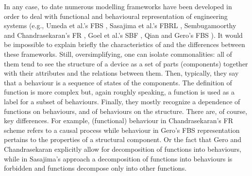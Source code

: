 \documentclass[sw]{iosart2x}
\newcommand{\myComment}[1]{{\unskip \ignorespaces}}
\begin{document}
In any case, to date numerous modelling frameworks have been developed in order to deal with functional and behavioural representation of engineering systems (e.g., Umeda et al.'s FBS \cite{umedaFunctionBehaviourStructure1990}, Sasajima et al.'s FBRL \cite{sasajimaFBRLFunctionBehavior1995}, Sembugamoorthy and Chandrasekaran's FR \cite{sembugamoorthy1986functional}, Goel et al.'s SBF \cite{goelUseDesignPatterns2004}, Qian and Gero's FBS \cite{qianFunctionBehaviorStructure1996}).
It would be impossible to explain briefly the characteristics of and the differences between these frameworks. Still, oversimplifying, one can isolate commonalities: all of them tend to see the structure of a device as a set of parts (components) together with their attributes and the relations between them. Then, typically, they say that a behaviour is a sequence of states of the components. The definition of function is more \myComment{murky} complex but, \myComment{\textit{de facto}} again roughly speaking, a function is used as a label for a subset of behaviours. Finally, they \myComment{often} mostly recognize a dependence of functions on behaviours, and of behaviours on the structure. 
There are, of course, key differences. 
For example, (functional) behaviour in Chandrasekaran’s FR scheme refers to a causal process while behaviour in Gero’s FBS representation pertains to the properties of a structural component.
Or the fact that Gero and Chandrasekaran explicitly allow for decomposition of functions into behaviours, while in Sasajima's approach a decomposition of functions into behaviours is forbidden and functions decompose only into other functions.  
\end{document}
